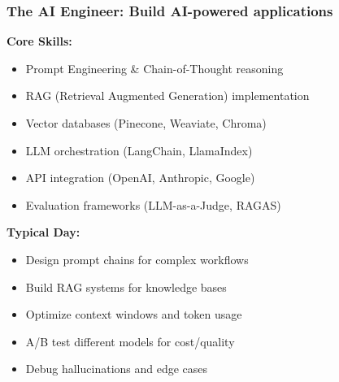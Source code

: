 \begin{frame}[fragile]\frametitle{The AI Engineer: Build AI-powered applications }

\textbf{Core Skills:}
\begin{itemize}
\item Prompt Engineering \& Chain-of-Thought reasoning
\item RAG (Retrieval Augmented Generation) implementation
\item Vector databases (Pinecone, Weaviate, Chroma)
\item LLM orchestration (LangChain, LlamaIndex)
\item API integration (OpenAI, Anthropic, Google)
\item Evaluation frameworks (LLM-as-a-Judge, RAGAS)
\end{itemize}

\textbf{Typical Day:}
\begin{itemize}
\item Design prompt chains for complex workflows
\item Build RAG systems for knowledge bases
\item Optimize context windows and token usage
\item A/B test different models for cost/quality
\item Debug hallucinations and edge cases
\end{itemize}

\end{frame}

% 
% 
% 

